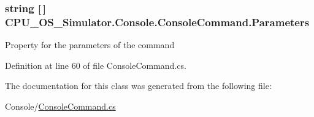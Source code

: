 \subsubsection[{Parameters}]{\setlength{\rightskip}{0pt plus 5cm}string \mbox{[}$\,$\mbox{]} C\+P\+U\+\_\+\+O\+S\+\_\+\+Simulator.\+Console.\+Console\+Command.\+Parameters\hspace{0.3cm}{\ttfamily [get]}}\label{class_c_p_u___o_s___simulator_1_1_console_1_1_console_command_a0c21b7943f52a37bcc2481b40202d064}


Property for the parameters of the command 



Definition at line 60 of file Console\+Command.\+cs.



The documentation for this class was generated from the following file\+:\begin{DoxyCompactItemize}
\item 
Console/\hyperlink{_console_command_8cs}{Console\+Command.\+cs}\end{DoxyCompactItemize}
